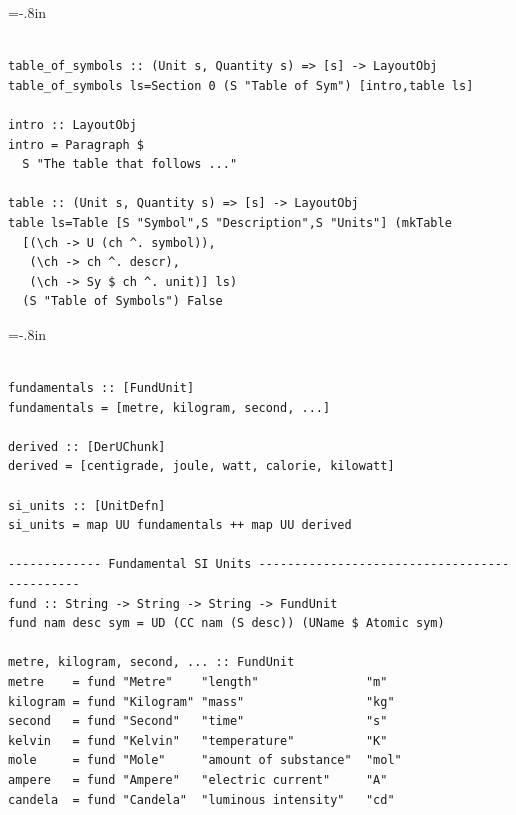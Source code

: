\documentclass{beamer}
\begin{document}
\hoffset=0in %

\hoffset=-.8in %

\begin{frame}


\begin{lstlisting}[frame=none, showstringspaces=false, basicstyle=\footnotesize]

table_of_symbols :: (Unit s, Quantity s) => [s] -> LayoutObj
table_of_symbols ls=Section 0 (S "Table of Sym") [intro,table ls]

intro :: LayoutObj
intro = Paragraph $ 
  S "The table that follows ..."
  
table :: (Unit s, Quantity s) => [s] -> LayoutObj
table ls=Table [S "Symbol",S "Description",S "Units"] (mkTable
  [(\ch -> U (ch ^. symbol)), 
   (\ch -> ch ^. descr), 
   (\ch -> Sy $ ch ^. unit)] ls)
  (S "Table of Symbols") False

\end{lstlisting}
\end{frame}

\hoffset=0in %

\hoffset=-.8in %

\begin{frame}


\begin{lstlisting}[frame=none, showstringspaces=false, basicstyle=\footnotesize]

fundamentals :: [FundUnit]
fundamentals = [metre, kilogram, second, ...]

derived :: [DerUChunk]
derived = [centigrade, joule, watt, calorie, kilowatt]

si_units :: [UnitDefn]
si_units = map UU fundamentals ++ map UU derived

------------- Fundamental SI Units ---------------------------------------------
fund :: String -> String -> String -> FundUnit
fund nam desc sym = UD (CC nam (S desc)) (UName $ Atomic sym)

metre, kilogram, second, ... :: FundUnit
metre    = fund "Metre"    "length"               "m"
kilogram = fund "Kilogram" "mass"                 "kg"
second   = fund "Second"   "time"                 "s"
kelvin   = fund "Kelvin"   "temperature"          "K"
mole     = fund "Mole"     "amount of substance"  "mol"
ampere   = fund "Ampere"   "electric current"     "A"
candela  = fund "Candela"  "luminous intensity"   "cd"

\end{lstlisting}
\end{frame}
\end{document}
